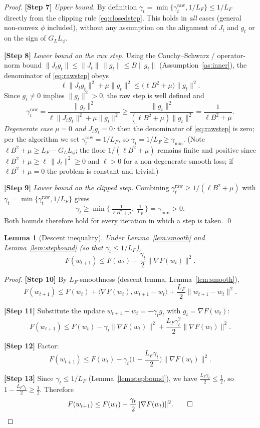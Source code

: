 \documentclass[11pt]{article}
\newtheorem{lemma}{Lemma}
\begin{document}
\begin{proof}
\textbf{[Step 7]} \emph{Upper bound.} By definition
$\gamma_t = \min\{\gamma_t^{\mathrm{raw}}, 1/L_F\} \le 1/L_F$ directly from the
clipping rule \eqref{eq:closedstep}. This holds in \emph{all} cases (general
non-convex $\phi$ included), without any assumption on the alignment of $J_t$
and $g_t$ or on the sign of $G_L L_\phi$.

\textbf{[Step 8]} \emph{Lower bound on the raw step.} Using the Cauchy--Schwarz /
operator-norm bound $\|J_t g_t\|\le \|J_t\|\,\|g_t\|\le B\|g_t\|$
(Assumption~\ref{as:inner}), the denominator of \eqref{eq:rawstep} obeys
\[
\ell\|J_t g_t\|^2 + \mu\|g_t\|^2 \le \big(\ell B^2 + \mu\big)\|g_t\|^2 .
\]
Since $g_t\ne 0$ implies $\|g_t\|^2>0$, the raw step is well defined and
\[
\gamma_t^{\mathrm{raw}}
= \frac{\|g_t\|^2}{\ell\|J_t g_t\|^2 + \mu\|g_t\|^2}
\ge \frac{\|g_t\|^2}{(\ell B^2 + \mu)\|g_t\|^2}
= \frac{1}{\ell B^2 + \mu} .
\]
\emph{Degenerate case $\mu=0$ and $J_t g_t = 0$:} then the denominator of
\eqref{eq:rawstep} is zero; per the algorithm we set
$\gamma_t^{\mathrm{raw}} = 1/L_F$, so $\gamma_t = 1/L_F \ge \gamma_{\min}$.
(Note $\ell B^2+\mu \ge L_F - G_L L_\phi$; the floor $1/(\ell B^2+\mu)$ remains
finite and positive since $\ell B^2 + \mu \ge \ell\,\|J_t\|^2 \ge 0$ and
$\ell>0$ for a non-degenerate smooth loss; if $\ell B^2 + \mu = 0$ the problem
is constant and trivial.)

\textbf{[Step 9]} \emph{Lower bound on the clipped step.} Combining
$\gamma_t^{\mathrm{raw}} \ge 1/(\ell B^2+\mu)$ with $\gamma_t = \min\{
\gamma_t^{\mathrm{raw}}, 1/L_F\}$ gives
\[
\gamma_t \ge \min\Big\{\, \tfrac{1}{\ell B^2+\mu},\; \tfrac{1}{L_F} \,\Big\}
= \gamma_{\min} > 0 .
\]
Both bounds therefore hold for every iteration in which a step is taken. \qed
\end{proof}

\begin{lemma}[Descent inequality]\label{lem:descent}
Under Lemma~\ref{lem:smooth} and Lemma~\ref{lem:stepbound}
(so that $\gamma_t \le 1/L_F$),
\[
F(w_{t+1}) \le F(w_t) - \frac{\gamma_t}{2}\|\nabla F(w_t)\|^2 .
\]
\end{lemma}

\begin{proof}
\textbf{[Step 10]} By $L_F$-smoothness (descent lemma, Lemma~\ref{lem:smooth}),
\[
F(w_{t+1}) \le F(w_t) + \langle \nabla F(w_t), w_{t+1}-w_t\rangle
+ \frac{L_F}{2}\|w_{t+1}-w_t\|^2 .
\]

\textbf{[Step 11]} Substitute the update $w_{t+1}-w_t = -\gamma_t g_t$ with
$g_t = \nabla F(w_t)$:
\[
F(w_{t+1}) \le F(w_t) - \gamma_t \|\nabla F(w_t)\|^2
+ \frac{L_F \gamma_t^2}{2}\|\nabla F(w_t)\|^2 .
\]

\textbf{[Step 12]} Factor:
\[
F(w_{t+1}) \le F(w_t) - \gamma_t\Big(1 - \frac{L_F \gamma_t}{2}\Big)
\|\nabla F(w_t)\|^2 .
\]

\textbf{[Step 13]} Since $\gamma_t \le 1/L_F$ (Lemma~\ref{lem:stepbound}), we have
$\tfrac{L_F\gamma_t}{2}\le \tfrac12$, so
$1-\tfrac{L_F\gamma_t}{2}\ge \tfrac12$. Therefore
\[
F(w_{t+1}) \le F(w_t) - \frac{\gamma_t}{2}\|\nabla F(w_t)\|^2 . \qed
\]
\end{proof}
\end{document}
